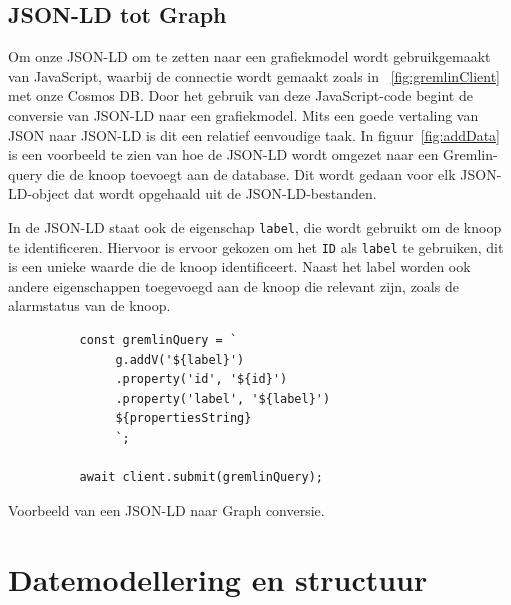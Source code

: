 \subsection{JSON-LD tot Graph}
Om onze JSON-LD om te zetten naar een grafiekmodel wordt gebruikgemaakt van JavaScript, waarbij de connectie wordt gemaakt zoals in ~\ref{fig:gremlinClient} met onze Cosmos DB.\@
Door het gebruik van deze JavaScript-code begint de conversie van JSON-LD naar een grafiekmodel. Mits een goede vertaling van JSON naar JSON-LD is dit een relatief eenvoudige taak.
In figuur~\ref{fig:addData} is een voorbeeld te zien van hoe de JSON-LD wordt omgezet naar een Gremlin-query die de knoop toevoegt aan de database.
Dit wordt gedaan voor elk JSON-LD-object dat wordt opgehaald uit de JSON-LD-bestanden.

In de JSON-LD staat ook de eigenschap \texttt{label}, die wordt gebruikt om de knoop te identificeren.
Hiervoor is ervoor gekozen om het \texttt{ID} als \texttt{label} te gebruiken, dit is een unieke waarde die de knoop identificeert.
Naast het label worden ook andere eigenschappen toegevoegd aan de knoop die relevant zijn, zoals de alarmstatus van de knoop.

\begin{listing} [H]
     \begin{verbatim}
          const gremlinQuery = `
               g.addV('${label}')
               .property('id', '${id}')
               .property('label', '${label}')
               ${propertiesString}
               `;

          await client.submit(gremlinQuery);
     \end{verbatim}
     \caption[Voorbeeld van een JSON-LD naar Graph conversie]{\label{fig:addData}Voorbeeld van een JSON-LD naar Graph conversie.}
\end{listing}
\section{Datemodellering en structuur}
